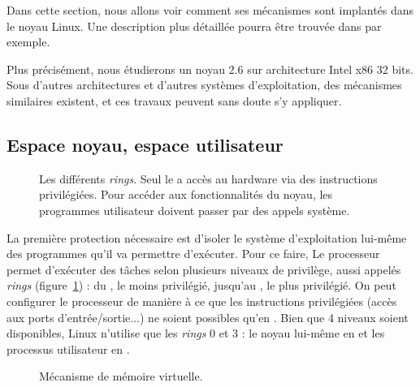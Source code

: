 Dans cette section, nous allons voir comment ses mécanismes sont implantés dans
le noyau Linux. Une description plus détaillée pourra être trouvée dans
\cite{UnderstandingTheLinuxKernel} par exemple.

Plus précisément, nous étudierons un noyau 2.6 sur architecture Intel x86 32
bits. Sous d'autres architectures et d'autres systèmes d'exploitation, des
mécanismes similaires existent, et ces travaux peuvent sans doute s'y appliquer.

\subsection{Espace noyau, espace utilisateur}

\begin{figure}

\caption[Les différents \emph{rings}]{
  Les différents \emph{rings}. Seul le  a accès au hardware
  via des instructions privilégiées. Pour accéder aux fonctionnalités du noyau,
  les programmes utilisateur doivent passer par des appels système.}
\label{fig:rings}
\end{figure}

La première protection nécessaire est d'isoler le système d'exploitation
lui-même des programmes qu'il va permettre d'exécuter. Pour ce faire, Le
processeur permet d'exécuter des tâches selon plusieurs niveaux de privilège,
aussi appelés \emph{rings} (figure~\ref{fig:rings}) : du , le
moins privilégié, jusqu'au , le plus privilégié. On peut configurer
le processeur de manière à ce que les instructions privilégiées (accès aux ports
d'entrée/sortie...) ne soient possibles qu'en . Bien que 4 niveaux
soient disponibles, Linux n'utilise que les \emph{rings} 0 et 3 : le noyau
lui-même en  et les processus utilisateur en .

\begin{figure}
\centering
{}
\caption{Mécanisme de mémoire virtuelle.}
\label{fig:memoire-virtuelle}
\end{figure}

